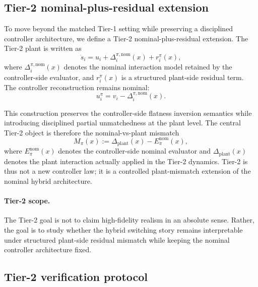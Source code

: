 
\subsection{Tier-2 nominal-plus-residual extension}
\label{subsec:tier2_formulation}

To move beyond the matched Tier-1 setting while preserving a disciplined controller architecture, we define a Tier-2 nominal-plus-residual extension. The Tier-2 plant is written as
\begin{equation}
\ddot s_i
=
u_i
+
\Delta_i^{\pi,\mathrm{nom}}(x)
+
r_i^\pi(x),
\label{eq:tier2_plant}
\end{equation}
where $\Delta_i^{\pi,\mathrm{nom}}(x)$ denotes the nominal interaction model retained by the controller-side evaluator, and $r_i^\pi(x)$ is a structured plant-side residual term. The controller reconstruction remains nominal:
\begin{equation}
u_i^\pi
=
v_i
-
\Delta_i^{\pi,\mathrm{nom}}(x).
\label{eq:tier2_controller}
\end{equation}

This construction preserves the controller-side flatness inversion semantics while introducing disciplined partial unmatchedness at the plant level. The central Tier-2 object is therefore the nominal-vs-plant mismatch
\begin{equation}
M_\pi(x)
:=
\Delta_{\mathrm{plant}}(x)-E_\pi^{\mathrm{nom}}(x),
\label{eq:tier2_mismatch_object}
\end{equation}
where $E_\pi^{\mathrm{nom}}(x)$ denotes the controller-side nominal evaluator and $\Delta_{\mathrm{plant}}(x)$ denotes the plant interaction actually applied in the Tier-2 dynamics. Tier-2 is thus not a new controller law; it is a controlled plant-mismatch extension of the nominal hybrid architecture.

\paragraph{Tier-2 scope.}
The Tier-2 goal is not to claim high-fidelity realism in an absolute sense. Rather, the goal is to study whether the hybrid switching story remains interpretable under structured plant-side residual mismatch while keeping the nominal controller architecture fixed.

\subsection{Tier-2 verification protocol}
\label{subsec:tier2_protocol}

